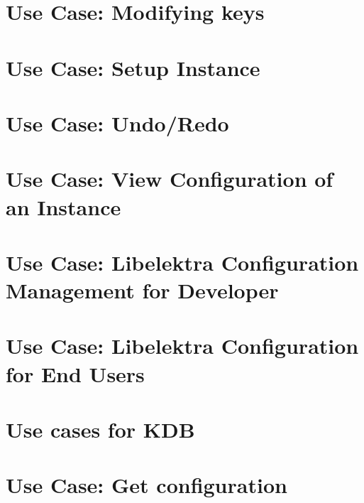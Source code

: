 \let\mypdfximage\pdfximage\def\pdfximage{\immediate\mypdfximage}\documentclass[twoside]{book}
\newcommand{\+}{\discretionary{\mbox{\scriptsize$\hookleftarrow$}}{}{}}
\begin{document}
\chapter{Use Case\+: Modifying keys}
\label{doc_usecases_elektra_web_UC_modifying_keys_md}

\chapter{Use Case\+: Setup Instance}
\label{doc_usecases_elektra_web_UC_setup_instance_md}

\chapter{Use Case\+: Undo/\+Redo}
\label{doc_usecases_elektra_web_UC_undo_redo_md}

\chapter{Use Case\+: View Configuration of an Instance}
\label{doc_usecases_elektra_web_UC_view_config_md}

\chapter{Use Case\+: Libelektra Configuration Management for Developer}
\label{doc_usecases_integration_UC_developer_md}

\chapter{Use Case\+: Libelektra Configuration for End Users}
\label{doc_usecases_integration_UC_end_user_md}

\chapter{Use cases for KDB}
\label{doc_usecases_kdb_README_md}

\chapter{Use Case\+: Get configuration}
\label{doc_usecases_kdb_UC_get_config_md}

\end{document}
